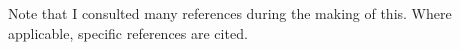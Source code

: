 \documentclass{article}
\begin{document}

\newpage
Note that I consulted many references during the making of this. Where applicable, specific references are cited.
\nocite{*}
\end{document}
